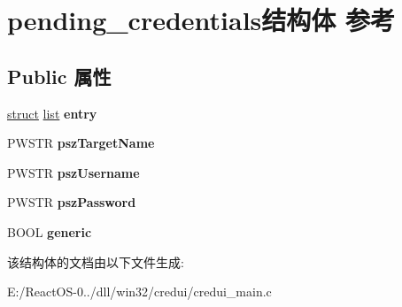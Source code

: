 \hypertarget{structpending__credentials}{}\section{pending\+\_\+credentials结构体 参考}
\label{structpending__credentials}
\subsection*{Public 属性}
\begin{DoxyCompactItemize}
\item 
\mbox{\label{structpending__credentials_aa19e8f1d431904378454addb6352e301}} 
\hyperlink{interfacestruct}{struct} \hyperlink{classlist}{list} {\bfseries entry}
\item 
\mbox{\label{structpending__credentials_a8251a34a9971a35c4397325e6d0e67d0}} 
P\+W\+S\+TR {\bfseries psz\+Target\+Name}
\item 
\mbox{\label{structpending__credentials_a4c28dd3d66e7ce20f19514c4f8b1da1e}} 
P\+W\+S\+TR {\bfseries psz\+Username}
\item 
\mbox{\label{structpending__credentials_ad57ed3242649bc975cec2aee68d47655}} 
P\+W\+S\+TR {\bfseries psz\+Password}
\item 
\mbox{\label{structpending__credentials_ab4bc41f899c767d65659c010456818ef}} 
B\+O\+OL {\bfseries generic}
\end{DoxyCompactItemize}


该结构体的文档由以下文件生成\+:\begin{DoxyCompactItemize}
\item 
E\+:/\+React\+O\+S-\/0../dll/win32/credui/credui\+\_\+main.\+c\end{DoxyCompactItemize}

